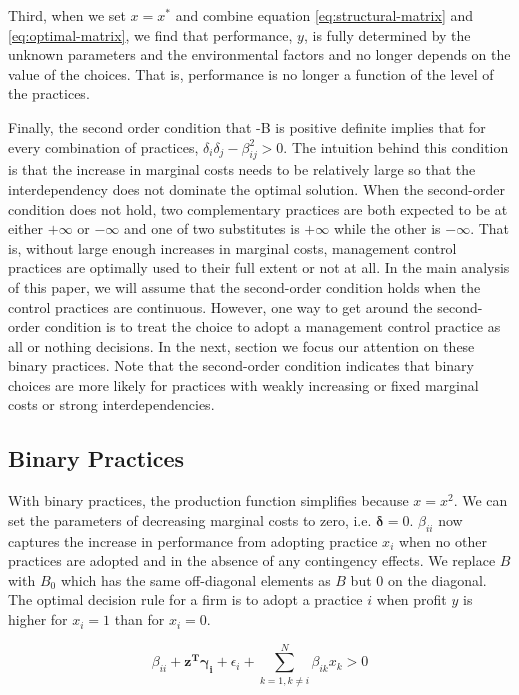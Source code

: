 \documentclass[12pt]{article}
\begin{document}
Third, when we set $x = x^*$ and combine equation \eqref{eq:structural-matrix} and \eqref{eq:optimal-matrix}, we find that performance, $y$, is fully determined by the unknown parameters and the environmental factors and no longer depends on the value of the choices. That is, performance is no longer a function of the level of the practices. 

Finally, the second order condition that -B is positive definite implies that for every combination of practices, $\delta_i \delta_j - \beta_{ij}^2 > 0$. The intuition behind this condition is that the increase in marginal costs needs to be relatively large so that the interdependency does not dominate the optimal solution. When the second-order condition does not hold, two complementary practices are both expected to be at either \(+\infty\) or \(-\infty\) and one of two substitutes is \(+\infty\) while the other is \(-\infty\). That is, without large enough increases in marginal costs, management control practices are optimally used to their full extent or not at all. In the main analysis of this paper, we will assume that the second-order condition holds when the control practices are continuous. However, one way to get around the second-order condition is to treat the choice to adopt a management control practice as all or nothing decisions. In the next, section we focus our attention on these binary practices. Note that the second-order condition indicates that binary choices are more likely for practices with weakly increasing or fixed marginal costs or strong interdependencies.

\subsection{Binary Practices}

With binary practices, the production function simplifies because $x = x^2$. We can set the parameters of decreasing marginal costs to zero, i.e. $\mathbf{\delta} = 0$. $\beta_{ii}$ now captures the increase in performance from adopting practice $x_i$ when no other practices are adopted and in the absence of any contingency effects. We replace $B$ with $B_0$ which has the same off-diagonal elements as $B$ but $0$ on the diagonal. The optimal decision rule for a firm is to adopt a practice $i$ when profit $y$ is higher for $x_i = 1$ than for $x_i = 0$. 

\begin{equation} \label{eq:condition-binary}
    \beta_{ii} + \mathbf{z^T} \mathbf{\gamma_i} + \epsilon_i 
    + \sum^{N}_{k = 1, k \neq i} \beta_{ik} x_k > 0
\end{equation}
\end{document}
